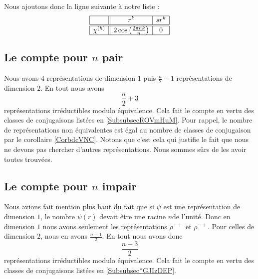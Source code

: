 Nous ajoutons donc la ligne suivante à notre liste :
\begin{equation*}
    \begin{array}[]{|c||c|c|}
        \hline
        &r^k&sr^k\\
        \hline\hline
        \chi^{(h)}&2\cos\left( \frac{ 2\pi hk }{ n } \right)&0\\
        \hline
    \end{array}
\end{equation*}

\subsection{Le compte pour $n$ pair}

Nous avons \( 4\) représentations de dimension \( 1\) puis \( \frac{ n }{2}-1\) représentations de dimension \( 2\). En tout nous avons 
\begin{equation}
 \frac{ n }{2}+3
\end{equation}
représentations irréductibles modulo équivalence. Cela fait le compte en vertu des classes de conjugaisons listées en \ref{SubsubsecROVmHuM}. Pour rappel, le nombre de représentations non équivalentes est égal au nombre de classes de conjugaison par le corollaire \ref{CorbdcVNC}. Notons que c'est cela qui justifie le fait que nous ne devons pas chercher d'autres représentations. Nous sommes sûrs de les avoir toutes trouvées.

\subsection{Le compte pour $n$ impair}

Nous avions fait mention plus haut du fait que si \( \psi\) est une représentation de dimension \( 1\), le nombre \( \psi(r)\) devait être une racine \( n\)\Ieme de l'unité. Donc en dimension \( 1\) nous avons seulement les représentations \( \rho^{++}\) et \( \rho^{-+}\). Pour celles de dimension \( 2\), nous en avons \( \frac{ n-1 }{2}\). En tout nous avons donc
\begin{equation}
    \frac{ n+3 }{2}
\end{equation}
représentations irréductibles modulo équivalence. Cela fait le compte en vertu des classes de conjugaisons listées en \ref{Subsubsec*GJIzDEP}.
